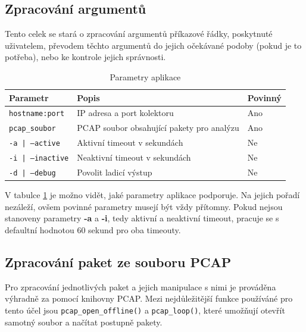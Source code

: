 \documentclass[11pt, a4paper, hidelinks]{article}[08.10.2023]
\begin{document}
    \subsection{Zpracování argumentů}
    Tento celek se stará o zpracování argumentů příkazové řádky, poskytnuté uživatelem, převodem těchto argumentů
    do jejich očekávané podoby (pokud je to potřeba), nebo ke kontrole jejich správnosti.

    \begin{table}[ht]
        \centering
        \begin{tabular}{|l|l|l|}
        \hline
        \textbf{Parametr}         & \textbf{Popis}                                                  & \textbf{Povinný}  \\ \hline
        \texttt{hostname:port}    & IP adresa a port kolektoru                                      & Ano              \\ \hline
        \texttt{pcap\_soubor}     & PCAP soubor obsahující pakety pro analýzu                       & Ano              \\ \hline
        \texttt{-a | --active}         & Aktivní timeout v sekundách                                     & Ne               \\ \hline
        \texttt{-i | --inactive}         & Neaktivní timeout v sekundách                                   & Ne               \\ \hline
        \texttt{-d | --debug}               & Povolit ladicí výstup                                           & Ne               \\ \hline
        \end{tabular}
        \caption{Parametry aplikace}
        \label{parametry}
    \end{table}
        
    V tabulce \ref{parametry} je možno vidět, jaké parametry aplikace podporuje. Na jejich pořadí nezáleží, ovšem povinné parametry
    musejí být vždy přítomny. Pokud nejsou stanoveny parametry \textbf{-a} a \textbf{-i}, tedy aktivní a neaktivní timeout, pracuje se s 
    defaultní hodnotou 60 sekund pro oba timeouty.

    \subsection{Zpracování paket ze souboru PCAP}
    Pro zpracování jednotlivých paket a jejich manipulace s nimi je prováděna výhradně za pomocí knihovny PCAP. Mezi nejdůležitější funkce používáné pro tento účel jsou \texttt{pcap\_open\_offline()} a \texttt{pcap\_loop()}, které umožňují otevřít samotný soubor a načítat postupně pakety\cite{Pcap_open_offline}\cite{Pcap_loop}.
\end{document}

